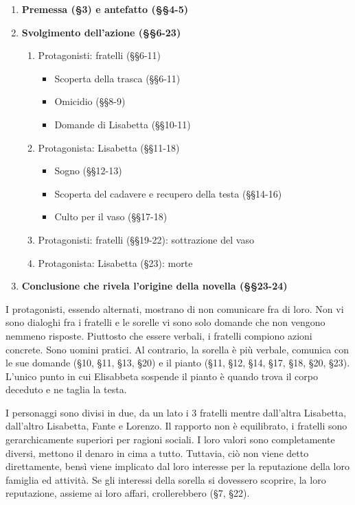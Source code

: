 \documentclass[a4paper]{article}
\begin{document}

\begin{enumerate}
    \item \textbf{Premessa (§3) e antefatto (§§4-5)}
    \item \textbf{Svolgimento dell'azione (§§6-23)}
    \begin{enumerate}
        \item Protagonisti: fratelli (§§6-11)
        \begin{itemize}
            \item Scoperta della trasca (§§6-11)
            \item Omicidio (§§8-9)
            \item Domande di Lisabetta (§§10-11)
        \end{itemize}
        \item Protagonista: Lisabetta (§§11-18)
        \begin{itemize}
            \item Sogno (§§12-13)
            \item Scoperta del cadavere e recupero della testa (§§14-16)
            \item Culto per il vaso (§§17-18)
        \end{itemize}
        \item Protagonisti: fratelli (§§19-22): sottrazione del vaso
        \item Protagonista: Lisabetta (§23): morte
    \end{enumerate}
    \item \textbf{Conclusione che rivela l'origine della novella (§§23-24)}
\end{enumerate}


I protagonisti, essendo alternati, mostrano di non comunicare fra di loro.
Non vi sono dialoghi fra i fratelli e le sorelle vi sono solo domande che non vengono nemmeno risposte.
Piuttosto che essere verbali, i fratelli compiono azioni concrete. Sono uomini pratici.
Al contrario, la sorella è più verbale, comunica con le sue domande (§10, §11, §13, §20) e il pianto (§11, §12, §14, §17, §18, §20, §23).
L'unico punto in cui Elisabbeta sospende il pianto è quando trova il corpo deceduto e ne taglia la testa.

I personaggi sono divisi in due, da un lato i 3 fratelli mentre dall'altra Lisabetta, dall'altro Lisabetta, Fante e Lorenzo.
Il rapporto non è equilibrato, i fratelli sono gerarchicamente superiori per ragioni sociali.
I loro valori sono completamente diversi, mettono il denaro in cima a tutto. Tuttavia, ciò non viene detto direttamente,
bensì viene implicato dal loro interesse per la reputazione della loro famiglia ed attività.
Se gli interessi della sorella si dovessero scoprire, la loro reputazione, assieme ai loro affari, crollerebbero (§7, §22).
\end{document}
